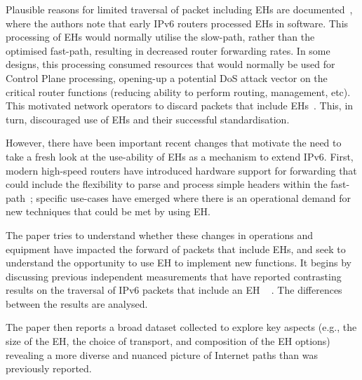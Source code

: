 \documentclass[conference]{IEEEtran}
\begin{document}
Plausible reasons for limited traversal of packet including EHs are documented~\cite{ietf-v6ops-HBH-03}, where the authors note that early IPv6 routers
processed EHs in software. This processing of EHs would normally utilise the slow-path, rather than the optimised fast-path, resulting in decreased router forwarding rates. In some designs, this processing consumed resources that would normally be used for Control Plane processing, opening-up a potential DoS attack vector on the critical router functions (reducing ability to perform routing, management, etc). This motivated network operators to discard packets that include EHs~\cite{rfc9098}.  This, in turn,
discouraged use of EHs and their successful standardisation. 

However, there have been important recent changes that motivate the need to take a fresh look at the use-ability of EHs as a mechanism to extend IPv6. First, modern high-speed routers have introduced hardware support for forwarding that could include the flexibility to parse and process simple headers within the fast-path~\cite{cisco-silicon-one}; specific use-cases have emerged where there is an operational demand for new techniques that could be met by using EH.


The paper tries to understand whether these changes in operations and equipment have impacted the forward of packets that include EHs, and seek to understand the opportunity to use EH to implement new functions. It begins by discussing previous independent measurements that have reported contrasting results on the traversal of IPv6 packets that include an EH ~\cite{RFC7872} \cite{apnic} \cite{nalini-iepg114} \cite{james}. The differences between the results are analysed.

The paper then reports a broad dataset collected to explore key aspects (e.g., the size of the EH, the choice of transport, and composition of the EH options) revealing a more diverse and nuanced picture of Internet paths than was previously reported.

\end{document}

